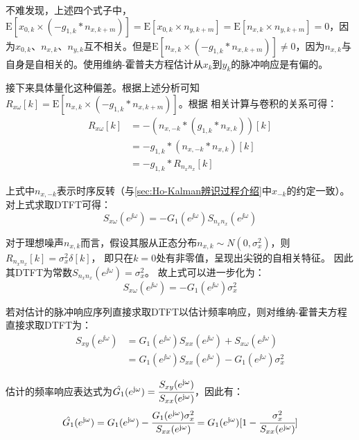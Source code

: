 不难发现，上述四个式子中，\(\text{E}[x_{0,k}\times(-g_{1,k}*n_{x,k+m})]=\text{E}[x_{0,k}\times n_{y,k+m}]=
\text{E}[n_{x,k}\times n_{y,k+m}]=0\)，因为\(x_{0,k}\)、\(n_{x,k}\)、\(n_{y,k}\)互不相关。但是\(\text{E}[n_{x,k}\times(-g_{1,k}*n_{x,k+m})]
\neq 0\)，因为\(n_{x,k}\)与自身是自相关的。使用维纳-霍普夫方程估计从\(x_k\)到\(y_k\)的脉冲响应是有偏的。

接下来具体量化这种偏差。根据上述分析可知\(R_{x\omega}[k]=\text{E}[n_{x,k}\times(-g_{1,k}*n_{x,k+m})]\)。根据
相关计算与卷积的关系可得：
\begin{align*}
    R_{x\omega}[k]&=-(n_{x,-k}*(g_{1,k}*n_{x,k}))[k]\\
    &=-g_{1,k} * (n_{x,-k}*n_{x,k})[k]\\
    &=-g_{1,k}*R_{n_xn_x}[k]
\end{align*}

上式中\(n_{x,-k}\)表示时序反转（与\ref{sec:Ho-Kalman辨识过程介绍}中\(x_{-k}\)的约定一致）。对上式求取DTFT可得：
\begin{equation*}
    S_{x\omega}(e^{\jj\omega})=-G_1(e^{\jj\omega})S_{n_xn_x}(e^{\jj\omega})
\end{equation*}

对于理想噪声\(n_{x,k}\)而言，假设其服从正态分布\(n_{x,k}\sim N(0,\sigma_x^2)\)，则
\(R_{n_xn_x}[k]=\sigma_x^2\delta[k]\)，
即只在\(k=0\)处有非零值，呈现出尖锐的自相关特征。
因此其DTFT为常数\(S_{n_xn_x}(e^{\jj\omega})=\sigma_x^2\)。
故上式可以进一步化为：
\begin{equation*}
    S_{x\omega}(e^{\jj\omega})=-G_1(e^{\jj\omega})\sigma_x^2
\end{equation*}

若对估计的脉冲响应序列直接求取DTFT以估计频率响应，则对维纳-霍普夫方程直接求取DTFT为：
\begin{align*}
    S_{xy}(e^{\jj\omega})&=G_1(e^{\jj\omega})S_{xx}(e^{\jj\omega})+S_{x\omega}(e^{\jj\omega})\\
    &=G_1(e^{\jj\omega})S_{xx}(e^{\jj\omega})-G_1(e^{\jj\omega})\sigma_x^2
\end{align*}

估计的频率响应表达式为\(\hat{G_1}(e^{\mathrm{j}\omega})=\cfrac{S_{xy}(e^{\mathrm{j}\omega})}{S_{xx}(e^{\mathrm{j}\omega})}\)，因此有：
\begin{equation}
    \hat{G_1}(e^{\mathrm{j}\omega})=G_1(e^{\mathrm{j}\omega})-\cfrac{G_1(e^{\mathrm{j}\omega})\sigma_x^2}{S_{xx}(e^{\mathrm{j}\omega})}
    =G_1(e^{\mathrm{j}\omega})[1-\cfrac{\sigma_x^2}{S_{xx}(e^{\mathrm{j}\omega})}]
    \label{eq:闭环有偏性公式}
\end{equation}

